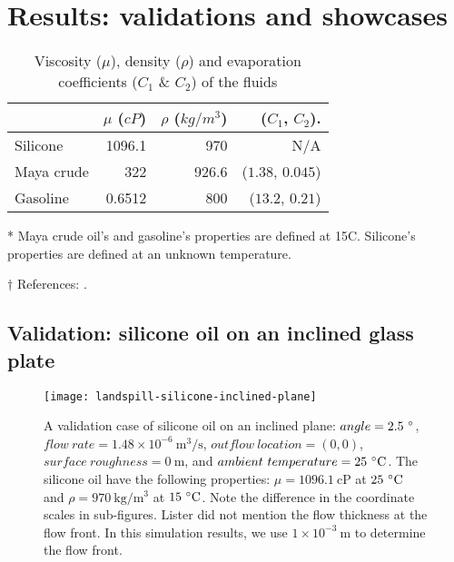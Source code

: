 \section{Results: validations and showcases}

\begin{table}
    \caption{Viscosity ($\mu$), density ($\rho$) and evaporation coefficients ($C_1$ \& $C_2$) of the fluids}
    \begin{threeparttable}
        \begin{tabular*}{\tblwidth}{@{} LRRR@{} }
            \toprule
            & $\mu$ ($cP$) & $\rho$ ($kg/m^3$) & ($C_1$, $C_2$). \\
            \midrule
            Silicone    & 1096.1 & 970 & N/A \\
            Maya crude  & 322 & 926.6 & ($1.38$, $0.045$) \\
            Gasoline    & 0.6512 & 800 & ($13.2$, $0.21$) \\
            \bottomrule
        \end{tabular*}
        \begin{tablenotes}\footnotesize
            \item[*] Maya crude oil's and gasoline's properties are defined at 15\degree C.
                Silicone's properties are defined at an unknown temperature.
            \item[$\dagger$] References: \cite{fingas_appendix_2015}.
        \end{tablenotes}
    \end{threeparttable}
    \label{table:fluid-properties}
\end{table}


\subsection{Validation: silicone oil on an inclined glass plate}

\begin{figure*}
    \centering
    \texttt{[image: landspill-silicone-inclined-plane]}
    \caption{%
        A validation case of silicone oil on an inclined plane: $angle=2.5\ \mathrm{\degree}$, $flow\ rate=1.48\times 10^{-6}\ \mathrm{m^3/s}$, $outflow\ location=(0, 0)$, $surface\ roughness=0\ \mathrm{m}$, and $ambient\ temperature=25\ \mathrm{\degree C}$. %
        The silicone oil have the following properties: $\mu=1096.1\ \mathrm{cP}$ at $25\ \mathrm{\degree C}$ and $\rho=970\ \mathrm{kg/m^3}$ at $15\ \mathrm{\degree C}$. %
        Note the difference in the coordinate scales in sub-figures. %
        Lister did not mention the flow thickness at the flow front. %
        In this simulation results, we use $1\times 10^{-3}\ \mathrm{m}$ to determine the flow front.%
    }
    \label{fig:landspill-silicone-inclined}
\end{figure*}

